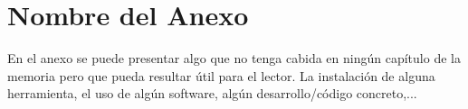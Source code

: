 \chapter{Nombre del Anexo}\label{anexo_A}
En el anexo se puede presentar algo que no tenga cabida en ningún capítulo de la memoria pero que pueda resultar útil para el lector. La instalación de alguna herramienta, el uso de algún software, algún desarrollo/código concreto,...



